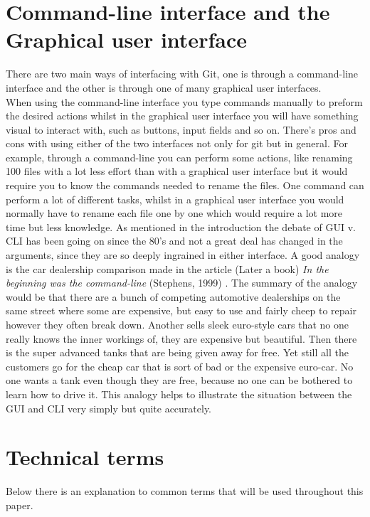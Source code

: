 \documentclass[a4paper,oneside]{bth} %
\begin{document}
			\section{Command-line interface and the Graphical user interface}
			There are two main ways of interfacing with Git, one is through a command-line interface and the other is through one of many graphical user interfaces. \cite{GitGUIs}\\
			
			When using the command-line interface you type commands manually to preform the desired actions whilst in the graphical user interface you will have something visual to interact with, such as buttons, input fields and so on.
			There's pros and cons with using either of the two interfaces not only for git but in general.
			For example, through a command-line you can perform some actions, like renaming 100 files with a lot less effort than with a graphical user interface but it would require you to know the commands needed to rename the files. One command can perform a lot of different tasks, whilst in a graphical user interface you would normally have to rename each file one by one which would require a lot more time but less knowledge. As mentioned in the introduction the debate of GUI v. CLI has been going on since the 80's and not a great deal has changed in the arguments, since they are so deeply ingrained in either interface. 
			A good analogy is the car dealership comparison made in the article (Later a book) \textit{In the beginning was the command-line} (Stephens, 1999) \cite{InTheBeginning}. The summary of the analogy would be that there are a bunch of competing automotive dealerships on the same street where some are expensive, but easy to use and fairly cheep to repair however they often break down. Another sells sleek euro-style cars that no one really knows the inner workings of, they are expensive but beautiful. Then there is the super advanced tanks that are being given away for free. Yet still all the customers go for the cheap car that is sort of bad or the expensive euro-car. No one wants a tank even though they are free, because no one can be bothered to learn how to drive it. 
			This analogy helps to illustrate the situation between the GUI and CLI very simply but quite accurately. 
			
			\section{Technical terms}
			Below there is an explanation to common terms that will be used throughout this paper.
			
\end{document}
